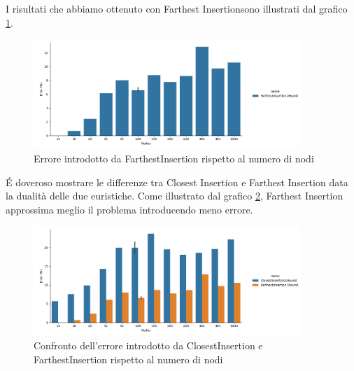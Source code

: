 \noindent I risultati che abbiamo ottenuto con Farthest Insertionsono
illustrati dal grafico \ref{fig:farthest-insertion-accuracy-error}.\\

\begin{figure}[H]
    \centering

    \includegraphics[width=0.9\textwidth]{./images/FarthestInsertion1Round__approximation_error_.png}

    \caption{Errore introdotto da FarthestInsertion rispetto al numero di nodi}
    \label{fig:farthest-insertion-accuracy-error}
\end{figure}

\noindent \'E doveroso mostrare le differenze tra Closest Insertion e
Farthest Insertion data la dualità delle due euristiche. Come
illustrato dal grafico
\ref{fig:closest-farthest-insertion-accuracy-error}, Farthest
Insertion approssima meglio il problema introducendo meno errore.\\

\begin{figure}[H]
    \centering

    \includegraphics[width=0.9\textwidth]{./images/ClosestInsertion1Round_vs_FarthestInsertion1Round__approximation_error_.png}

    \caption{Confronto dell'errore introdotto da ClosestInsertion e FarthestInsertion rispetto al numero di nodi}
    \label{fig:closest-farthest-insertion-accuracy-error}
\end{figure}

